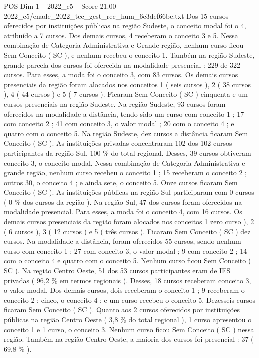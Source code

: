 \begin{textsample}{POS Dim 1 – 2022\_c5 – Score 21.00 – 2022\_c5/enade\_2022\_tec\_gest\_rec\_hum\_6c3def66be.txt}
Dos 15 cursos oferecidos por instituições públicas na região Sudeste, o conceito modal foi o 4, atribuído a 7 cursos.
Dos demais cursos, 4 receberam o conceito 3 e 5.
Nessa combinação de Categoria Administrativa e Grande região, nenhum curso ficou Sem Conceito ( SC ), e nenhum recebeu o conceito 1.
Também na região Sudeste, grande parcela dos cursos foi oferecida na modalidade presencial : 229 de 322 cursos.
Para esses, a moda foi o conceito 3, com 83 cursos.
Os demais cursos presenciais da região foram alocados nos conceitos 1 ( seis cursos ), 2 ( 38 cursos ), 4 ( 44 cursos ) e 5 ( 7 cursos ).
Ficaram Sem Conceito ( SC ) cinquenta e um cursos presenciais na região Sudeste.
Na região Sudeste, 93 cursos foram oferecidos na modalidade a distância, tendo sido um curso com conceito 1 ; 17 com conceito 2 ; 41 com conceito 3, o valor modal ; 20 com o conceito 4 ; e quatro com o conceito 5.
Na região Sudeste, dez cursos a distância ficaram Sem Conceito ( SC ).
As instituições privadas concentraram 102 dos 102 cursos participantes da região Sul, 100 \% do total regional.
Desses, 39 cursos obtiveram conceito 3, o conceito modal.
Nessa combinação de Categoria Administrativa e grande região, nenhum curso recebeu o conceito 1 ; 15 receberam o conceito 2 ; outros 30, o conceito 4 ; e ainda sete, o conceito 5.
Onze cursos ficaram Sem Conceito ( SC ).
As instituições públicas na região Sul participaram com 0 cursos ( 0 \% dos cursos da região ).
Na região Sul, 47 dos cursos foram oferecidos na modalidade presencial.
Para esses, a moda foi o conceito 4, com 16 cursos.
Os demais cursos presenciais da região foram alocados nos conceitos 1 zero curso ), 2 ( 6 cursos ), 3 ( 12 cursos ) e 5 ( três cursos ).
Ficaram Sem Conceito ( SC ) dez cursos.
Na modalidade a distância, foram oferecidos 55 cursos, sendo nenhum curso com conceito 1 ; 27 com conceito 3, o valor modal ; 9 com conceito 2 ; 14 com o conceito 4 e quatro com o conceito 5.
Nenhum curso ficou Sem Conceito ( SC ).
Na região Centro Oeste, 51 dos 53 cursos participantes eram de IES privadas ( 96,2 \% em termos regionais ).
Desses, 18 cursos receberam conceito 3, o valor modal.
Dos demais cursos, dois receberam o conceito 1 ; 9 receberam o conceito 2 ; cinco, o conceito 4 ; e um curso recebeu o conceito 5.
Dezesseis cursos ficaram Sem Conceito ( SC ).
Quanto aos 2 cursos oferecidos por instituições públicas na região Centro Oeste ( 3,8 \% do total regional ), 1 curso apresentou o conceito 1 e 1 curso, o conceito 3.
Nenhum curso ficou Sem Conceito ( SC ) nessa região.
Também na região Centro Oeste, a maioria dos cursos foi presencial : 37 ( 69,8 \% ).

\end{textsample}
